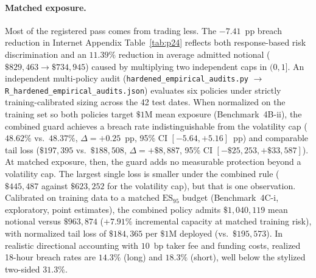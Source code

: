 \documentclass[12pt]{article}
\theoremstyle{definition}
\theoremstyle{remark}
\begin{document}
\paragraph{Matched exposure.} Most of the registered pass comes from trading less. The $-7.41$~pp breach reduction in Internet Appendix Table~\ref{tab:p24} reflects both response-based risk discrimination and an $11.39\%$ reduction in average admitted notional ($\$829{,}463 \to \$734{,}945$) caused by multiplying two independent caps in $(0,1]$. An independent multi-policy audit (\texttt{hardened\_empirical\_audits.py} $\to$ \texttt{R\_hardened\_empirical\_audits.json}) evaluates six policies under strictly training-calibrated sizing across the 42 test dates. When normalized on the training set so both policies target $\$1\text{M}$ mean exposure (Benchmark~4B-ii), the combined guard achieves a breach rate indistinguishable from the volatility cap ($48.62\%$ vs.\ $48.37\%$, $\Delta=+0.25$~pp, 95\% CI $[-5.64,+5.16]$~pp) and comparable tail loss ($\$197{,}395$ vs.\ $\$188{,}508$, $\Delta=+\$8{,}887$, 95\% CI $[-\$25{,}253,+\$33{,}587]$). At matched exposure, then, the guard adds no measurable protection beyond a volatility cap. The largest single loss is smaller under the combined rule ($\$445{,}487$ against $\$623{,}252$ for the volatility cap), but that is one observation. Calibrated on training data to a matched $\mathrm{ES}_{95}$ budget (Benchmark~4C-i, exploratory, point estimates), the combined policy admits $\$1{,}040{,}119$ mean notional versus $\$963{,}874$ ($+7.91\%$ incremental capacity at matched training risk), with normalized tail loss of $\$184{,}365$ per $\$1\text{M}$ deployed (vs.\ $\$195{,}573$). In realistic directional accounting with $10$~bp taker fee and funding costs, realized 18-hour breach rates are $14.3\%$ (long) and $18.3\%$ (short), well below the stylized two-sided $31.3\%$.
\end{document}
